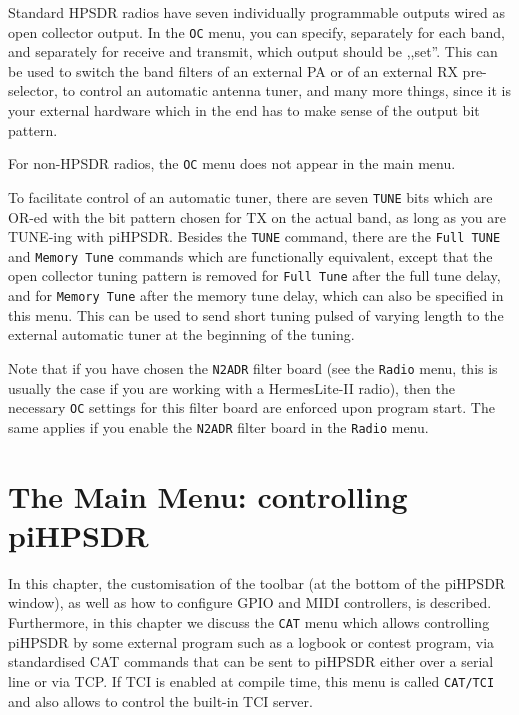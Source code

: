 \documentclass[12pt]{book}
\def\rett#1{\texttt{\color{red}#1}}
\def\bltt#1{\texttt{\color{blue}#1}}
\def\pH{pi\-HPSDR\xspace}
\begin{document}
Standard HPSDR radios have seven individually programmable outputs wired as
open collector output. In the \bltt{OC} menu, you can specify, separately
for each band, and separately for receive and transmit, which output should
be ,,set''. This can be used to switch the band filters of an external PA
or of an external RX pre-selector, to control an automatic antenna tuner,
and many more things, since it is
your external hardware which in the end has to make sense of the output
bit pattern.

For non-HPSDR radios, the \bltt{OC} menu does not appear in the main menu.

To facilitate control of an automatic tuner, there are seven \rett{TUNE}
bits which are OR-ed with the bit pattern chosen for TX on the actual band,
as long as you are TUNE-ing with \pH. Besides the \bltt{TUNE} command,
there are the \bltt{Full TUNE} and \bltt{Memory Tune} commands which are
functionally equivalent, except that the open collector tuning pattern
is removed for \bltt{Full Tune} after the full tune delay, and for \bltt{Memory Tune}
after the memory tune delay, which can also be specified in this menu.
This can be used to send short tuning pulsed of varying length to the
external automatic tuner at the beginning of the tuning.



Note that if you have chosen the \texttt{N2ADR} filter board (see the \bltt{Radio} menu,
this is usually the
case if you are working with a HermesLite-II radio), then the necessary \bltt{OC}
settings for this filter board are enforced upon program start. The same applies if
you enable the \texttt{N2ADR} filter board in the \bltt{Radio} menu.

\chapter[Controlling \pH]{The Main Menu: controlling \pH}

In this chapter, the customisation of the toolbar (at the bottom of the \pH window),
as well as how to configure GPIO and MIDI controllers, is described. Furthermore, in this
chapter we discuss the \bltt{CAT} menu which allows controlling \pH by some external program
such as a logbook or contest program, via standardised CAT commands that can be sent to
\pH either over a serial line or via TCP. If TCI is enabled at compile  time, this menu
is called \bltt{CAT/TCI} and also allows to control the built-in TCI server.
\end{document}
